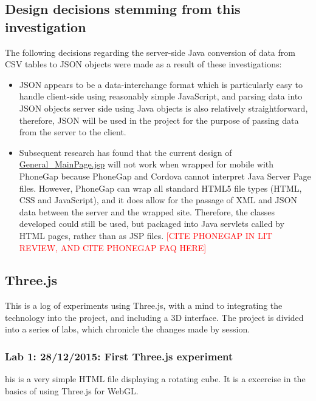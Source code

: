 \subsection{Design decisions stemming from this investigation}
\label{subSec: Java and JSON: Design decisions stemming from this investigation}

The following decisions regarding the server-side Java conversion of data from CSV tables to JSON objects were made as a result of these investigations:

\begin{itemize}
\item JSON appears to be a data-interchange format which is particularly easy to handle client-side using reasonably simple JavaScript, and parsing data into JSON objects server side using Java objects is also relatively straightforward, therefore, JSON will be used in the project for the purpose of passing data from the server to the client.

\item Subsequent research has found that the current design of \url{General_MainPage.jsp} will not work when wrapped for mobile with PhoneGap because PhoneGap and Cordova cannot interpret Java Server Page files. However, PhoneGap can wrap all standard HTML5 file types (HTML, CSS and JavaScript), and it does allow for the passage of XML and JSON data between the server and the wrapped site. Therefore, the classes developed could still be used, but packaged into Java servlets called by HTML pages, rather than as JSP files. \textcolor{red}{[CITE PHONEGAP IN LIT REVIEW, AND CITE PHONEGAP FAQ HERE]}
\end{itemize}

\subsection{Three.js}
\label{subSec:Three.js}
This is a log of experiments using Three.js, with a mind to integrating the technology into the project, and including a 3D interface. The project is divided into a series of labs, which chronicle the changes made by session.

\subsubsection{Lab 1: 28/12/2015: First Three.js experiment}
\label{subSubSec:ThreeJSExperiments:Lab1}
his is a very simple HTML file displaying a rotating cube. It is a excercise in the basics of using Three.js for WebGL.

